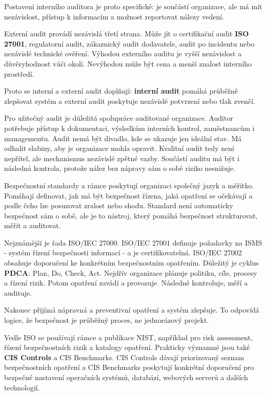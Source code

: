 \documentclass[11pt,a4paper]{article}
\begin{document}
Postavení interního auditora je proto specifické: je součástí organizace, ale má mít nezávislost, přístup k informacím a možnost reportovat nálezy vedení.

Externí audit provádí nezávislá třetí strana. Může jít o certifikační audit \textbf{ISO 27001}, regulatorní audit, zákaznický audit dodavatele, audit po incidentu nebo nezávislé technické ověření. Výhodou externího auditu je vyšší nezávislost a důvěryhodnost vůči okolí. Nevýhodou může být cena a menší znalost interního prostředí.

Proto se interní a externí audit doplňují: \textbf{interní audit} pomáhá průběžně zlepšovat systém a externí audit poskytuje nezávislé potvrzení nebo tlak zvenčí.

Pro užitečný audit je důležitá spolupráce auditované organizace. Auditor potřebuje přístup k dokumentaci, výsledkům interních kontrol, zaměstnancům i managementu. Audit nemá být divadlo, kde se ukazuje jen ideální stav. Má odhalit slabiny, aby je organizace mohla opravit. Kvalitní audit tedy není nepřítel, ale mechanismus nezávislé zpětné vazby. Součástí auditu má být i následná kontrola, protože nález bez nápravy sám o sobě riziko nesnižuje.

Bezpečnostní standardy a rámce poskytují organizaci společný jazyk a měřítko. Pomáhají definovat, jak má být bezpečnost řízena, jaká opatření se očekávají a podle čeho lze posuzovat zralost nebo shodu. Standard není automaticky bezpečnost sám o sobě, ale je to nástroj, který pomáhá bezpečnost strukturovat, měřit a auditovat.

Nejznámější je řada ISO/IEC 27000. ISO/IEC 27001 definuje požadavky na ISMS - systém řízení bezpečnosti informací - a je certifikovatelná. ISO/IEC 27002 obsahuje doporučení ke konkrétním bezpečnostním opatřením. Důležitý je cyklus \textbf{PDCA}: Plan, Do, Check, Act. Nejdřív organizace plánuje politiku, cíle, procesy a řízení rizik. Potom opatření zavádí a provozuje. Následně kontroluje, měří a audituje.

Nakonec přijímá nápravná a preventivní opatření a systém zlepšuje. To odpovídá logice, že bezpečnost je průběžný proces, ne jednorázový projekt.

Vedle ISO se používají rámce a publikace NIST, například pro risk assessment, řízení bezpečnostních rizik a katalogy opatření. Prakticky významné jsou také \textbf{CIS Controls} a CIS Benchmarks. CIS Controls dávají priorizovaný seznam bezpečnostních opatření a CIS Benchmarks poskytují konkrétní doporučení pro bezpečné nastavení operačních systémů, databází, webových serverů a dalších technologií.
\end{document}
